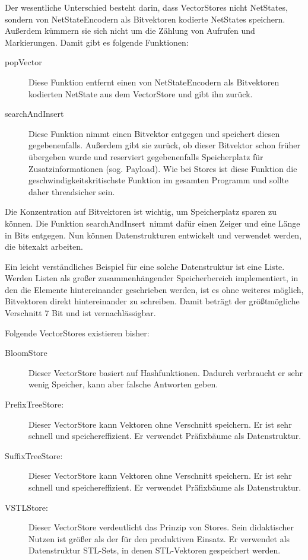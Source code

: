 \documentclass[12pt,a4paper,titlepage]{scrartcl}
\renewcommand \( {\left (}
\renewcommand \) {\right )}
\renewcommand \[ {\left [}
\renewcommand \] {\right ]}
\newcommand \Flqq {\flqq\ }
\begin{document}
Der wesentliche Unterschied besteht darin, dass VectorStores nicht NetStates, sondern von NetStateEncodern als Bitvektoren kodierte NetStates speichern. Außerdem kümmern sie sich nicht um die Zählung von Aufrufen und Markierungen. Damit gibt es folgende Funktionen:
\begin{description}
\item[popVector] Diese Funktion entfernt einen von NetStateEncodern als Bitvektoren kodierten NetState aus dem VectorStore und gibt ihn zurück. 
\item[searchAndInsert] Diese Funktion nimmt einen Bitvektor entgegen und speichert diesen gegebenenfalls. Außerdem gibt sie zurück, ob dieser Bitvektor schon früher übergeben wurde und reserviert gegebenenfalls Speicherplatz für Zusatzinformationen (sog. Payload). Wie bei Stores ist diese Funktion die geschwindigkeitskritischste Funktion im gesamten Programm und sollte daher threadsicher sein.
\end{description}
Die Konzentration auf Bitvektoren ist wichtig, um Speicherplatz sparen zu können. Die Funktion \frqq searchAndInsert\Flqq nimmt dafür einen Zeiger und eine Länge in Bits entgegen. Nun können Datenstrukturen entwickelt und verwendet werden, die bitexakt arbeiten.

Ein leicht verständliches Beispiel für eine solche Datenstruktur ist eine Liste. Werden Listen als großer zu\-sammen\-hängen\-der Speicherbereich implementiert, in den die Elemente hintereinander geschrieben werden, ist es ohne weiteres möglich, Bitvektoren direkt hintereinander zu schreiben. Damit beträgt der größtmögliche Verschnitt 7 Bit und ist vernachlässigbar.

Folgende VectorStores existieren bisher:
\begin{description}
\item[BloomStore] Dieser VectorStore basiert auf Hashfunktionen. Dadurch verbraucht er sehr wenig Speicher, kann aber falsche Antworten geben.
\item[PrefixTreeStore:] Dieser VectorStore kann Vektoren ohne Verschnitt speichern. Er ist sehr schnell und speichereffizient. Er verwendet Präfixbäume als Datenstruktur.
\item[SuffixTreeStore:] Dieser VectorStore kann Vektoren ohne Verschnitt speichern. Er ist sehr schnell und speichereffizient. Er verwendet Präfixbäume als Datenstruktur.
\item[VSTLStore:] Dieser VectorStore verdeutlicht das Prinzip von Stores. Sein didaktischer Nutzen ist größer als der für den produktiven Einsatz. Er verwendet als Datenstruktur STL-Sets, in denen STL-Vektoren gespeichert werden.
\end{description}
\end{document}
